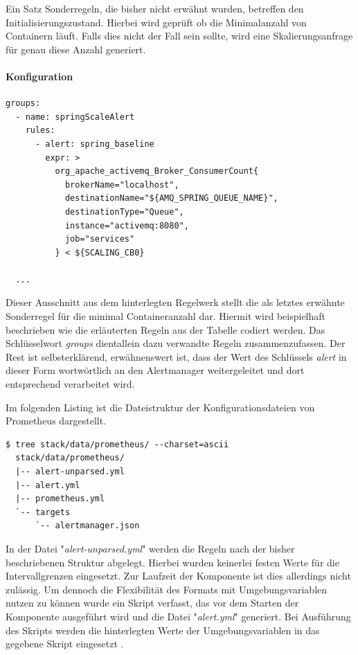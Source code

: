 Ein Satz Sonderregeln, die bisher nicht erwähnt wurden, betreffen den Initialisierungszustand. Hierbei wird geprüft ob die Minimalanzahl von Containern läuft. Falls dies nicht der Fall sein sollte, wird eine Skalierungsanfrage für genau diese Anzahl generiert.


\paragraph{Konfiguration}

\begin{lstlisting}[style=bashStyle,caption={Umgebungsvariablen - Prometheus Regelsatz},label=lst:envMatrix]
  groups:
  - name: springScaleAlert
    rules:
      - alert: spring_baseline
        expr: >
          org_apache_activemq_Broker_ConsumerCount{
            brokerName="localhost",
            destinationName="${AMQ_SPRING_QUEUE_NAME}", 
            destinationType="Queue",
            instance="activemq:8080", 
            job="services"
          } < ${SCALING_CB0} 

  ...

\end{lstlisting}

Dieser Ausschnitt aus dem hinterlegten Regelwerk stellt die als letztes erwähnte Sonderregel für die minimal Containeranzahl dar. Hiermit wird beispielhaft beschrieben wie die erläuterten Regeln aus der Tabelle codiert werden. Das Schlüsselwort \emph{groups} dientallein dazu verwandte Regeln zusammenzufassen. Der Rest ist selbsterklärend, erwähnenswert ist, dass der Wert des Schlüssels \emph{alert} in dieser Form wortwörtlich an den Alertmanager weitergeleitet und dort entsprechend verarbeitet wird.

Im folgenden Listing ist die Dateistruktur der Konfigurationsdateien von Prometheus dargestellt.

\begin{lstlisting}[style=bashStyle,caption={Umgebungsvariablen - Prometheus Regelsatz},label=lst:envMatrix]
  $ tree stack/data/prometheus/ --charset=ascii
  stack/data/prometheus/
  |-- alert-unparsed.yml
  |-- alert.yml
  |-- prometheus.yml
  `-- targets
      `-- alertmanager.json
\end{lstlisting}

In der Datei "\emph{alert-unparsed.yml}" werden die Regeln nach der bisher beschriebenen Struktur abgelegt. Hierbei wurden keinerlei festen Werte für die Intervallgrenzen eingesetzt. Zur Laufzeit der Komponente ist dies allerdings nicht zulässig. Um dennoch die Flexibilität des Formats mit Umgebungsvariablen nutzen zu können wurde ein Skript verfasst, das vor dem Starten der Komponente ausgeführt wird und die Datei "\emph{alert.yml}" generiert. Bei Ausführung des Skripts werden die hinterlegten Werte der Umgebungsvariablen in das gegebene Skript eingesetzt . 

